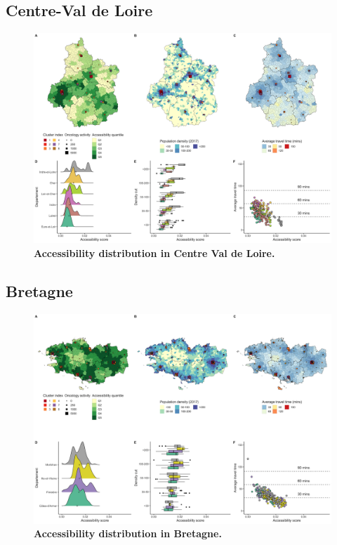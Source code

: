 \subsection*{Centre-Val de Loire}

\begin{figure}[H]
    \includegraphics[width=\textwidth]{images/camion/region_accessibility/accessibility_Centre-Val-de-Loire.png}
    \centering
    \caption{
        \textbf{Accessibility distribution in Centre Val de Loire.}
    }
\end{figure}

\subsection*{Bretagne}

\begin{figure}[H]
    \includegraphics[width=\textwidth]{images/camion/region_accessibility/accessibility_Bretagne.png}
    \centering
    \caption{
        \textbf{Accessibility distribution in Bretagne.}
    }
\end{figure}


